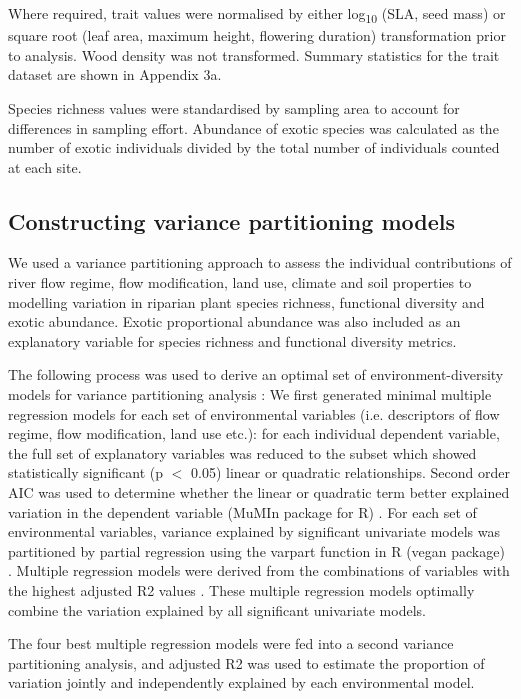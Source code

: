 \documentclass[openright,12pt,a4paper]{memoir}
\begin{document}
Where required, trait values were normalised by either log\textsubscript{10} (SLA, seed mass) or square root (leaf area, maximum height, flowering duration) transformation prior to analysis. Wood density was not transformed. Summary statistics for the trait dataset are shown in Appendix 3a.

Species richness values were standardised by sampling area to account for differences in sampling effort. Abundance of exotic species was calculated as the number of exotic individuals divided by the total number of individuals counted at each site.

\subsection{Constructing variance partitioning models}
We used a variance partitioning approach to assess the individual contributions of river flow regime, flow modification, land use, climate and soil properties to modelling variation in riparian plant species richness, functional diversity and exotic abundance. Exotic proportional abundance was also included as an explanatory variable for species richness and functional diversity metrics. 

The following process was used to derive an optimal set of environment-diversity models for variance partitioning analysis \citep{Legendre2007}:
We first generated minimal multiple regression models for each set of environmental variables (i.e. descriptors of flow regime, flow modification, land use etc.): for each individual dependent variable, the full set of explanatory variables was reduced to the subset which showed statistically significant (p $<$ 0.05) linear or quadratic relationships. Second order AIC was used to determine whether the linear or quadratic term better explained variation in the dependent variable (MuMIn package for R) \citep{barton2012mumin, burnham2002model}. For each set of environmental variables, variance explained by significant univariate models was partitioned by partial regression using the varpart function in R (vegan package) \citep{Oksanen2013}. Multiple regression models were derived from the combinations of variables with the highest adjusted R2 values \citep{Peres-Neto2006}. These multiple regression models optimally combine the variation explained by all significant univariate models.

The four best multiple regression models were fed into a second variance partitioning analysis, and adjusted R2 was used to estimate the proportion of variation jointly and independently explained by each environmental model.  
\end{document}
